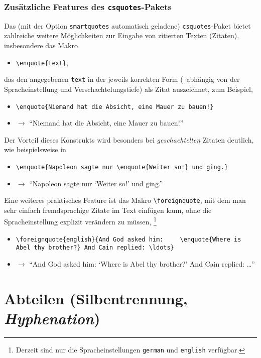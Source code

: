 \subsubsection{Zusätzliche Features des \texttt{csquotes}-Pakets}
Das (mit der Option \texttt{smartquotes} automatisch geladene)
\texttt{csquotes}-Paket bietet zahlreiche weitere Möglichkeiten zur 
Eingabe von zitierten Texten (Zitaten), insbesondere das Makro
%
\begin{itemize}
\item[] \verb!\enquote{text}!,
\end{itemize}
%
das den angegebenen \texttt{text} in der jeweils korrekten Form (\ua\ abhängig von der Sprach\-einstellung und
Verschachtelungstiefe) als Zitat auszeichnet, zum Beispiel,
%
\begin{itemize}
\item[] \verb|\enquote{Niemand hat die Absicht, eine Mauer zu bauen!}| 
\item[] $\rightarrow$ \enquote{Niemand hat die Absicht, eine Mauer zu bauen!}
\end{itemize}
%
Der Vorteil dieses Konstrukts wird besonders bei \emph{geschachtelten} Zitaten deutlich, 
wie beispielsweise in
%
\begin{itemize}
\item[] \verb|\enquote{Napoleon sagte nur \enquote{Weiter so!} und ging.}| 
\item[] $\rightarrow$ \enquote{Napoleon sagte nur \enquote{Weiter so!} und ging.}
\end{itemize}
%
Eine weiteres praktisches Feature ist das Makro \verb!\foreignquote!, mit dem man sehr einfach
fremdsprachige Zitate im Text einfügen kann, ohne die Spracheinstellung
explizit verändern zu müssen, \zB%
\footnote{Derzeit sind nur die Spracheinstellungen \texttt{german} und \texttt{english} verfügbar.}
%
\begin{itemize}
\item[] \verb|\foreignquote{english}{And God asked him: |\newline
				\verb|   \enquote{Where is Abel thy brother?} And Cain replied: \ldots}| 
\item[] $\rightarrow$ \foreignquote{english}{And God asked him: \enquote{Where is Abel thy brother?} And Cain replied: \ldots}
\end{itemize}


\section{Abteilen (Silbentrennung, \emph{Hyphenation})}
\label{subsec:layout-abteilen}

